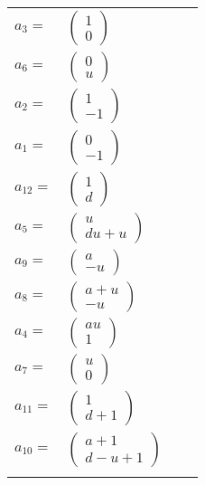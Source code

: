 \documentclass[1p]{elsarticle_modified}
\theoremstyle{definition}
\begin{document}
\begin{tabular}{m{7pt} m{180pt} m{7pt} m{180pt} }
\flushright $a_{3}=$&$\begin{pmatrix}1\\0\end{pmatrix}$ \\
\flushright $a_{6}=$&$\begin{pmatrix}0\\u\end{pmatrix}$ \\
\flushright $a_{2}=$&$\begin{pmatrix}1\\-1\end{pmatrix}$ \\
\flushright $a_{1}=$&$\begin{pmatrix}0\\-1\end{pmatrix}$ \\
\flushright $a_{12}=$&$\begin{pmatrix}1\\d\end{pmatrix}$ \\
\flushright $a_{5}=$&$\begin{pmatrix}u\\d u+u\end{pmatrix}$ \\
\flushright $a_{9}=$&$\begin{pmatrix}a\\- u\end{pmatrix}$ \\
\flushright $a_{8}=$&$\begin{pmatrix}a+u\\- u\end{pmatrix}$ \\
\flushright $a_{4}=$&$\begin{pmatrix}a u\\1\end{pmatrix}$ \\
\flushright $a_{7}=$&$\begin{pmatrix}u\\0\end{pmatrix}$ \\
\flushright $a_{11}=$&$\begin{pmatrix}1\\d+1\end{pmatrix}$ \\
\flushright $a_{10}=$&$\begin{pmatrix}a+1\\d- u+1\end{pmatrix}$\\&\end{tabular}
\end{document}
